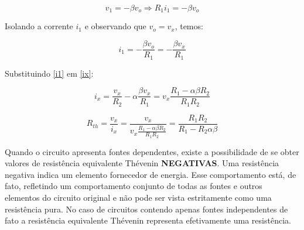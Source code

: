 \documentclass[12pt,fleqn]{book} %
\begin{document}
{\begin{equation}
v_1=-\beta v_o \Rightarrow R_1 i_1=-\beta v_o
\end{equation}

Isolando a corrente $i_1$ e observando que $v_o=v_x$, temos:

\begin{equation}\label{i1}
i_1=-\frac{\beta v_o}{R_1} =-\frac{\beta v_x}{R_1} 
\end{equation}

Substituindo \ref{i1} em  \ref{ix}:

\begin{equation}
i_x=\frac{v_x}{R_2} -\alpha\frac{\beta v_x}{R_1} = v_x\frac{R_1-\alpha\beta R_2}{R_1 R_2}
\end{equation}

\begin{equation}
R_{th} = \frac{v_x}{i_x} = \frac{v_x}{v_x\frac{R_1-\alpha\beta R_2}{R_1 R_2}} = \frac{R_1 R_2}{R_1-R_2 \alpha\beta}
\end{equation}
}

\begin{remark}
Quando o circuito apresenta fontes dependentes, existe a possibilidade de se obter valores de resistência equivalente Thévenin \textbf{NEGATIVAS}. Uma resistência negativa indica um elemento fornecedor de energia. Esse comportamento está, de fato, refletindo um comportamento conjunto de todas as fontes e outros elementos do circuito original e não pode ser vista estritamente como uma resistência pura. No caso de circuitos contendo apenas fontes independentes de fato a resistência equivalente Thévenin representa efetivamente uma resistência. 
\end{remark}
   
\end{document}
